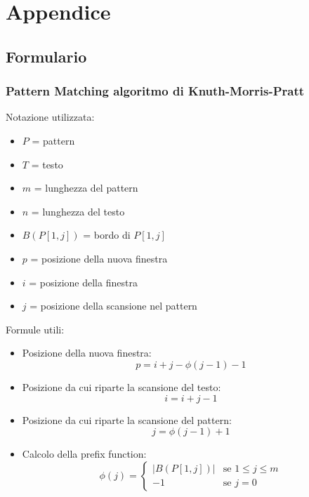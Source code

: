 \chapter{Appendice}
\section{Formulario}
\subsection{Pattern Matching algoritmo di Knuth-Morris-Pratt}
Notazione utilizzata:
\begin{itemize}
    \item $P$ = pattern
    \item $T$ = testo
    \item $m$ = lunghezza del pattern
    \item $n$ = lunghezza del testo
    \item $B(P[1, j])$ = bordo di $P[1, j]$
    \item $p$ = posizione della nuova finestra
    \item $i$ = posizione della finestra
    \item $j$ = posizione della scansione nel pattern
\end{itemize}
Formule utili:
\begin{itemize}
    \item Posizione della nuova finestra:
          \begin{equation}
              p = i + j - \phi(j - 1) - 1
          \end{equation}
    \item Posizione da cui riparte la scansione del testo:
          \begin{equation}
              i = i + j - 1
          \end{equation}
    \item Posizione da cui riparte la scansione del pattern:
          \begin{equation}
              j = \phi(j - 1) + 1
          \end{equation}
    \item Calcolo della prefix function:
          \begin{equation}
              \phi(j) = \begin{cases}
                  |B(P[1, j])| & \text{se } 1 \leq j \leq m \\
                  -1           & \text{se } j = 0
              \end{cases}
          \end{equation}
\end{itemize}
